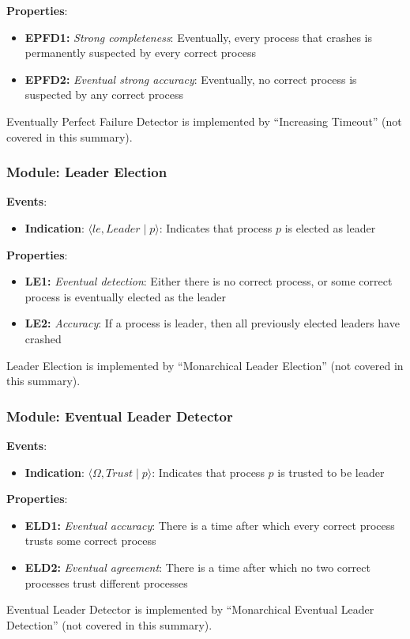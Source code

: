 \documentclass[12pt,A4]{extarticle}
\begin{document}
\textbf{Properties}:
\begin{itemize}
  \item{\textbf{EPFD1:} \textit{Strong completeness}: Eventually, every process that crashes is permanently suspected by every correct process}
  \item{\textbf{EPFD2:} \textit{Eventual strong accuracy}: Eventually, no correct process is suspected by any correct process}
\end{itemize}
Eventually Perfect Failure Detector is implemented by ``Increasing Timeout'' (not covered in this summary).

\subsubsection{Module: Leader Election}
\textbf{Events}:
\begin{itemize}
  \item{\textbf{Indication}: $\langle le, \textit{Leader} \mid p \rangle$: Indicates that process $p$ is elected as leader}
\end{itemize}

\textbf{Properties}:
\begin{itemize}
  \item{\textbf{LE1:} \textit{Eventual detection}: Either there is no correct process, or some correct process is eventually elected as the leader}
  \item{\textbf{LE2:} \textit{Accuracy}: If a process is leader, then all previously elected leaders have crashed}
\end{itemize}
Leader Election is implemented by ``Monarchical Leader Election'' (not covered in this summary).

\subsubsection{Module: Eventual Leader Detector}
\textbf{Events}:
\begin{itemize}
  \item{\textbf{Indication}: $\langle \Omega, \textit{Trust} \mid p \rangle$: Indicates that process $p$ is trusted to be leader}
\end{itemize}

\textbf{Properties}:
\begin{itemize}
  \item{\textbf{ELD1:} \textit{Eventual accuracy}: There is a time after which every correct process trusts some correct process}
  \item{\textbf{ELD2:} \textit{Eventual agreement}: There is a time after which no two correct processes trust different processes}
\end{itemize}
Eventual Leader Detector is implemented by ``Monarchical Eventual Leader Detection'' (not covered in this summary).
\end{document}
